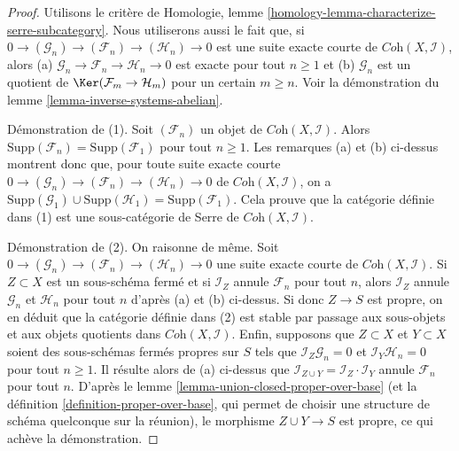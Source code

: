 \begin{proof}
Utilisons le critère de
Homologie, lemme \ref{homology-lemma-characterize-serre-subcategory}.
Nous utiliserons aussi le fait que, si
$0 \to (\mathcal{G}_n) \to (\mathcal{F}_n) \to (\mathcal{H}_n) \to 0$
est une suite exacte courte de $\textit{Coh}(X, \mathcal{I})$, alors
(a) $\mathcal{G}_n \to \mathcal{F}_n \to \mathcal{H}_n \to 0$
est exacte pour tout $n \geq 1$ et
(b) $\mathcal{G}_n$ est un quotient de $\Ker(\mathcal{F}_m \to \mathcal{H}_m)$
pour un certain $m \geq n$. Voir la démonstration du lemme \ref{lemma-inverse-systems-abelian}.

\medskip\noindent
Démonstration de (1). Soit $(\mathcal{F}_n)$ un objet de
$\textit{Coh}(X, \mathcal{I})$. Alors
$\text{Supp}(\mathcal{F}_n) = \text{Supp}(\mathcal{F}_1)$ pour tout $n \geq 1$.
Les remarques (a) et (b) ci-dessus montrent donc que,
pour toute suite exacte courte
$0 \to (\mathcal{G}_n) \to (\mathcal{F}_n) \to (\mathcal{H}_n) \to 0$
de $\textit{Coh}(X, \mathcal{I})$, on a
$\text{Supp}(\mathcal{G}_1) \cup \text{Supp}(\mathcal{H}_1) =
\text{Supp}(\mathcal{F}_1)$.
Cela prouve que la catégorie définie dans (1) est
une sous-catégorie de Serre de $\textit{Coh}(X, \mathcal{I})$.

\medskip\noindent
Démonstration de (2). On raisonne de même. Soit
$0 \to (\mathcal{G}_n) \to (\mathcal{F}_n) \to (\mathcal{H}_n) \to 0$
une suite exacte courte de $\textit{Coh}(X, \mathcal{I})$.
Si $Z \subset X$ est un sous-schéma fermé et si $\mathcal{I}_Z$
annule $\mathcal{F}_n$ pour tout $n$, alors
$\mathcal{I}_Z$ annule $\mathcal{G}_n$ et $\mathcal{H}_n$
pour tout $n$ d'après (a) et (b) ci-dessus.
Si donc $Z \to S$ est propre, on en déduit que la catégorie
définie dans (2) est stable par passage aux sous-objets et aux objets
quotients dans $\textit{Coh}(X, \mathcal{I})$.
Enfin, supposons que $Z \subset X$ et $Y \subset X$ soient
des sous-schémas fermés propres sur $S$ tels que
$\mathcal{I}_Z \mathcal{G}_n = 0$ et
$\mathcal{I}_Y \mathcal{H}_n = 0$ pour tout $n \geq 1$.
Il résulte alors de (a) ci-dessus que
$\mathcal{I}_{Z \cup Y} = \mathcal{I}_Z \cdot \mathcal{I}_Y$
annule $\mathcal{F}_n$ pour tout $n$.
D'après le lemme \ref{lemma-union-closed-proper-over-base}
(et la définition \ref{definition-proper-over-base},
qui permet de choisir une structure de schéma quelconque sur la
réunion), le morphisme $Z \cup Y \to S$ est propre, ce qui achève la démonstration.
\end{proof}








